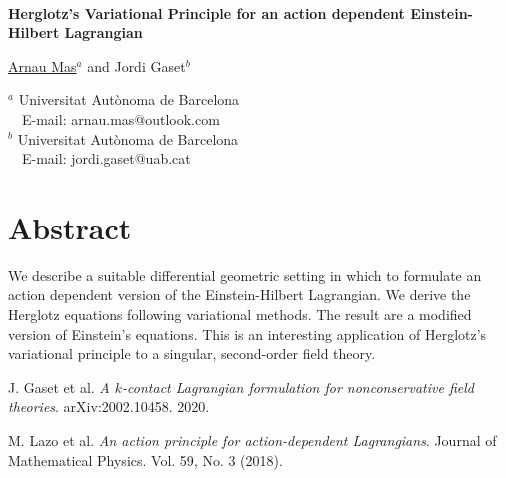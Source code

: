 \documentclass[11pt]{article}
\begin{document}
\thispagestyle{empty}

\

\begin{center}
 {\Large{\bf {Herglotz's Variational Principle for an action dependent Einstein-Hilbert Lagrangian}} }

\bigskip
\bigskip


{\sc \underline{Arnau Mas}$^a$ and Jordi Gaset$^b$}

\bigskip

{$^a$ Universitat Aut\`onoma de Barcelona\\ ~~E-mail: arnau.mas@outlook.com\\[10pt]
$^b$ Universitat Aut\`onoma de Barcelona\\ ~~E-mail: jordi.gaset@uab.cat
}

\end{center}


\section*{Abstract}
We describe a suitable differential geometric setting in which to formulate an action dependent version of the Einstein-Hilbert Lagrangian. We derive the Herglotz equations following variational methods. The result are a modified version of Einstein's equations. This is an interesting application of Herglotz's variational principle to a singular, second-order field theory. 



\begin{thebibliography}{5}

J. Gaset et al.  {\em A \( k \)-contact Lagrangian formulation for
nonconservative field theories}. arXiv:2002.10458. 2020.

 M. Lazo et al. {\em An action principle for action-dependent Lagrangians}.
Journal of Mathematical Physics. Vol. 59, No. 3 (2018).

\end{thebibliography}
\end{document}
